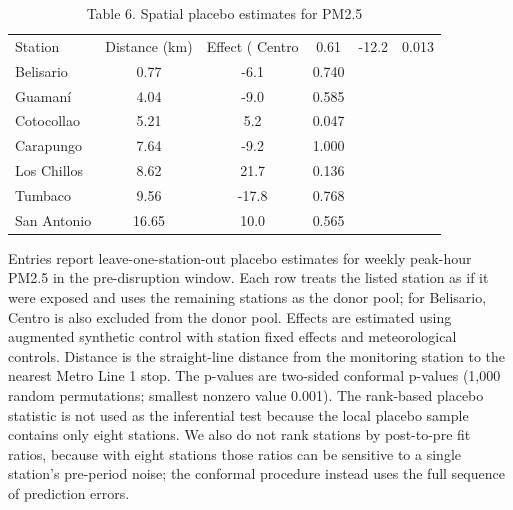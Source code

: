 \begin{table}[htbp]\centering
\begin{threeparttable}
\caption{Table 6. Spatial placebo estimates for PM2.5}
\begin{tabular}{lccc}
\toprule
Station & Distance (km) & Effect (%
\midrule
Centro & 0.61 & -12.2 & 0.013 \\
Belisario & 0.77 & -6.1 & 0.740 \\
Guamaní & 4.04 & -9.0 & 0.585 \\
Cotocollao & 5.21 & 5.2 & 0.047 \\
Carapungo & 7.64 & -9.2 & 1.000 \\
Los Chillos & 8.62 & 21.7 & 0.136 \\
Tumbaco & 9.56 & -17.8 & 0.768 \\
San Antonio & 16.65 & 10.0 & 0.565 \\
\bottomrule
\end{tabular}
\begin{tablenotes}\footnotesize
\item Entries report leave-one-station-out placebo estimates for weekly peak-hour PM2.5 in the pre-disruption window. Each row treats the listed station as if it were exposed and uses the remaining stations as the donor pool; for Belisario, Centro is also excluded from the donor pool. Effects are estimated using augmented synthetic control with station fixed effects and meteorological controls. Distance is the straight-line distance from the monitoring station to the nearest Metro Line 1 stop. The p-values are two-sided conformal p-values (1,000 random permutations; smallest nonzero value 0.001). The rank-based placebo statistic is not used as the inferential test because the local placebo sample contains only eight stations. We also do not rank stations by post-to-pre fit ratios, because with eight stations those ratios can be sensitive to a single station's pre-period noise; the conformal procedure instead uses the full sequence of prediction errors.
\end{tablenotes}
\end{threeparttable}
\end{table}

